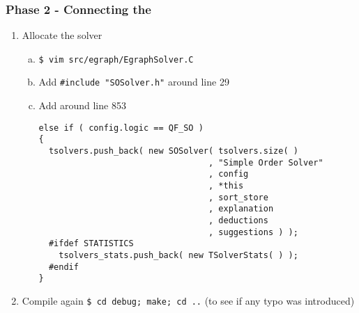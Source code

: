 \begin{frame}[fragile]
  \frametitle{Phase 2 - Connecting the \tsolver}

  \begin{enumerate}[2.]

    \item Allocate the solver

      \begin{enumerate}[a.]

	\scriptsize

	\vfill

	\item \verb|$ vim src/egraph/EgraphSolver.C|

	\vfill

	\item Add \verb|#include "SOSolver.h"| around line 29

	\vfill

	\item Add around line 853
	\begin{verbatim}
else if ( config.logic == QF_SO )
{
  tsolvers.push_back( new SOSolver( tsolvers.size( )
                                  , "Simple Order Solver"
                                  , config
                                  , *this
                                  , sort_store
                                  , explanation
                                  , deductions
                                  , suggestions ) );
  #ifdef STATISTICS
    tsolvers_stats.push_back( new TSolverStats( ) );
  #endif
}
	\end{verbatim}

      \end{enumerate}

      \vfill

      \item Compile again \verb|$ cd debug; make; cd ..| (to see
	    if any typo was introduced)

  \end{enumerate} 

\end{frame}
